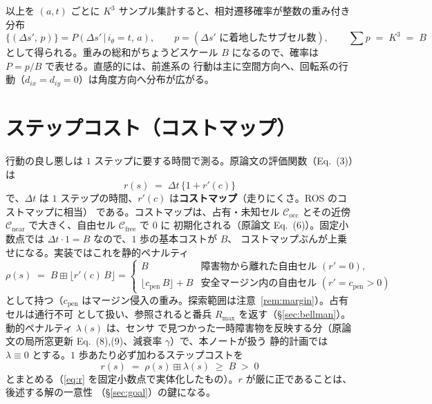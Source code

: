 \documentclass[11pt]{ltjsarticle}
\newcommand{\wadd}{\mathbin{\boxplus}}
\newcommand{\Rmax}{R_{\max}}        %
\newcommand{\Cfree}{\mathcal{C}_{\mathrm{free}}}
\newcommand{\Cocc}{\mathcal{C}_{\mathrm{occ}}}
\newcommand{\Cnear}{\mathcal{C}_{\mathrm{near}}}
\begin{document}
以上を $(a,t)$ ごとに $K^3$ サンプル集計すると、相対遷移確率が整数の重み付き分布
\begin{equation}
\big\{(\Delta s',\,p)\big\}=P(\Delta s'\,|\,i_\theta{=}t,\,a),\qquad
p=(\text{$\Delta s'$ に着地したサブセル数}),\qquad
\sum p \;=\; K^3 \;=\; B
\label{eq:tau}
\end{equation}
として得られる。重みの総和がちょうどスケール $B$ になるので、確率は $P=p/B$ で表せる。直感的には、前進系の
行動は主に空間方向へ、回転系の行動（$d_{ix}=d_{iy}=0$）は角度方向へ分布が広がる。

\section{ステップコスト（コストマップ）}
\label{sec:cost}

行動の良し悪しは $1$ ステップに要する時間で測る。原論文の評価関数（Eq.~(3)）は
\begin{equation}
r(s)\;=\;\Delta t\,\{1+r'(c)\}
\label{eq:r}
\end{equation}
で、$\Delta t$ は $1$ ステップの時間、$r'(c)$ は\textbf{コストマップ}（走りにくさ。ROS のコストマップに相当）
である。コストマップは、占有・未知セル $\Cocc$ とその近傍 $\Cnear$ で大きく、自由セル $\Cfree$ で $0$ に
初期化される（原論文 Eq.~(6)）。固定小数点では $\Delta t\cdot1=B$ なので、$1$ 歩の基本コストが $B$、
コストマップぶんが上乗せになる。実装ではこれを静的ペナルティ
\begin{equation}
\rho(s)\;=\;B\wadd\big\lfloor r'(c)\,B\big\rfloor=
\begin{cases}
B & \text{障害物から離れた自由セル }(r'{=}0),\\
\big\lfloor c_{\mathrm{pen}}\,B\big\rfloor + B & \text{安全マージン内の自由セル }(r'{=}c_{\mathrm{pen}}{>}0)
\end{cases}
\label{eq:penalty}
\end{equation}
として持つ（$c_{\mathrm{pen}}$ はマージン侵入の重み。探索範囲は注意~\ref{rem:margin}）。占有セルは通行不可
として扱い、参照されると番兵 $\Rmax$ を返す（\S\ref{sec:bellman}）。動的ペナルティ $\lambda(s)$ は、センサ
で見つかった一時障害物を反映する分（原論文の局所窓更新 Eq.~(8),(9)、減衰率 $\gamma$）で、本ノートが扱う
静的計画では $\lambda\equiv0$ とする。$1$ 歩あたり必ず加わるステップコストを
\begin{equation}
r(s)\;=\;\rho(s)\wadd\lambda(s)\;\ge\;B\;>\;0
\label{eq:g}
\end{equation}
とまとめる（\eqref{eq:r} を固定小数点で実体化したもの）。$r$ が厳に正であることは、後述する解の一意性
（\S\ref{sec:goal}）の鍵になる。
\end{document}
